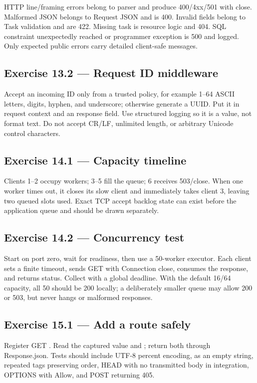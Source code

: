 HTTP line/framing errors belong to parser and produce 400/4xx/501 with close.
Malformed JSON belongs to Request JSON and is 400. Invalid fields belong to Task
validation and are 422. Missing task is resource logic and 404. SQL constraint
unexpectedly reached or programmer exception is 500 and logged. Only expected
public errors carry detailed client-safe messages.

\subsection*{Exercise 13.2 --- Request ID middleware}

Accept an incoming ID only from a trusted policy, for example 1--64 ASCII letters,
digits, hyphen, and underscore; otherwise generate a UUID. Put it in request
context and an  response field. Use structured logging so it
is a value, not format text. Do not accept CR/LF, unlimited length, or arbitrary
Unicode control characters.

\subsection*{Exercise 14.1 --- Capacity timeline}

Clients 1--2 occupy workers; 3--5 fill the queue; 6 receives 503/close. When one
worker times out, it closes its slow client and immediately takes client 3, leaving
two queued slots used. Exact TCP accept backlog state can exist before the
application queue and should be drawn separately.

\subsection*{Exercise 14.2 --- Concurrency test}

Start on port zero, wait for readiness, then use a 50-worker executor. Each client
sets a finite timeout, sends GET with Connection close, consumes the response,
and returns status. Collect with a global deadline. With the default 16/64
capacity, all 50 should be 200 locally; a deliberately smaller queue may allow
200 or 503, but never hangs or malformed responses.

\subsection*{Exercise 15.1 --- Add a route safely}

Register GET . Read the captured value and
; return both through Response.json. Tests
should include UTF-8 percent encoding,  as an empty string, repeated
tags preserving order, HEAD with no transmitted body in integration, OPTIONS
with Allow, and POST returning 405.

